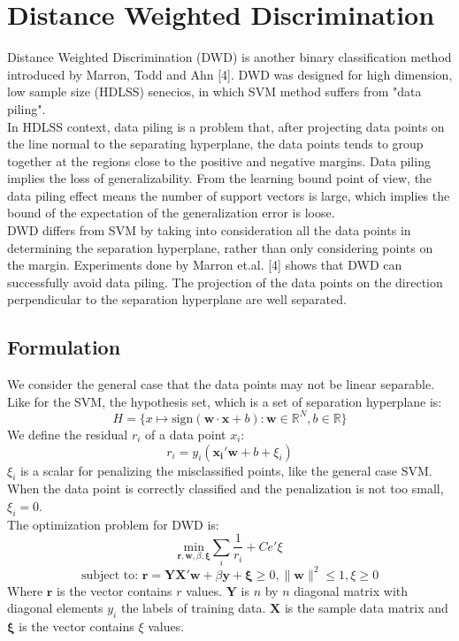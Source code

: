 \documentclass[12pt]{article}
\theoremstyle{definition}
\theoremstyle{remark}
\numberwithin{equation}{section}
\begin{document}
\section{Distance Weighted Discrimination}
Distance Weighted Discrimination (DWD) is another binary classification method introduced by Marron, Todd and Ahn [4]. DWD was designed for high dimension, low sample size (HDLSS) senecios, in which SVM method suffers from "data piling". \\[0.2cm]
In HDLSS context, data piling is a problem that, after projecting data points on the line normal to the separating hyperplane, the data points tends to group together at the regions close to the positive and negative margins. Data piling implies the loss of generalizability. From the learning bound point of view, the data piling effect means the number of support vectors is large, which implies the bound of the expectation of the generalization error is loose. \\[0.2cm]
DWD differs from SVM by taking into consideration all the data points in determining the separation hyperplane, rather than only considering points on the margin. Experiments done by Marron et.al. [4] shows that DWD can successfully avoid data piling. The projection of the data points on the direction perpendicular to the separation hyperplane are well separated.
\subsection{Formulation}
We consider the general case that the data points may not be linear separable. Like for the SVM, the hypothesis set, which is a set of separation hyperplane is:
\[H = \{x\mapsto \mathrm{sign}(\mathbf{w\cdot x}+b): \mathbf{w} \in \mathbb{R}^N, b \in \mathbb{R} \}\]
We define the residual $r_i$ of a data point $x_i$:
\[r_i = y_i(\mathbf{x_i'w}+b+\xi_i)\]
$\xi_i$ is a scalar for penalizing the misclassified points, like the general case SVM. When the data point is correctly classified and the penalization is not too small, $\xi_i = 0$. \\[0.2cm]
The optimization problem for DWD is:
\[\underset{\mathbf{r,w,}\beta,\mathbf{\xi}}{\mathrm{min}}\sum_i \frac{1}{r_i} + Ce'\xi\]
\[\text{subject to: }\mathbf{r} = \mathbf{YX'w} + \beta\mathbf{y} + \boldsymbol{\xi} \geq 0, \|\mathbf{w}\|^2 \leq 1, \xi \geq 0\]
Where $\mathbf{r}$ is the vector contains $r$ values. $\mathbf{Y}$ is $n$ by $n$ diagonal matrix with diagonal elements $y_i$ the labels of training data. $\mathbf{X}$ is the sample data matrix and $\boldsymbol{\xi}$ is the vector contains $\xi$ values.
\end{document}
